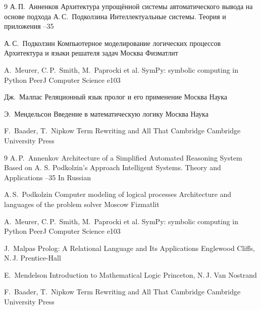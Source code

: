 \documentclass{intsys}
\begin{document}
\begin{thebibliographyRU}{9}
  \by А.\,П.~Анненков
  \paper Архитектура упрощённой системы автоматического вывода на
  основе подхода А.\,С.~Подколзина
  \jour Интеллектуальные системы. Теория и приложения
  --35

  \by А.\,С.~Подколзин
  \book Компьютерное моделирование логических процессов
  \voltitle Архитектура и языки решателя задач
  \publaddr Москва
  \publ Физматлит

  \by A.~Meurer, C.\,P.~Smith, M.~Paprocki et al.
  \paper SymPy: symbolic computing in Python
  \jour PeerJ Computer Science
  \pages e103

  \by Дж.~Малпас
  \book Реляционный язык пролог и его применение
  \publaddr Москва
  \publ Наука

  \by Э.~Мендельсон
  \book Введение в математическую логику
  \publaddr Москва
  \publ Наука

  \by F.~Baader, T.~Nipkow
  \book Term Rewriting and All That
  \publaddr Cambridge
  \publ Cambridge University Press

\end{thebibliographyRU}

\begin{thebibliographyEN}{9}
  \by A.\,P.~Annenkov
  \paper Architecture of a Simplified Automated Reasoning System
  Based on A. S. Podkolzin's Approach
  \jour Intelligent Systems. Theory and Applications
  --35
  \lang In Russian

  \by A.\,S.~Podkolzin
  \book Computer modeling of logical processes
  \voltitle Architecture and languages of the problem solver
  \publaddr Moscow
  \publ Fizmatlit

  \by A.~Meurer, C.\,P.~Smith, M.~Paprocki et al.
  \paper SymPy: symbolic computing in Python
  \jour PeerJ Computer Science
  \pages e103

  \by J.~Malpas
  \book Prolog: A Relational Language and Its Applications
  \publaddr Englewood Cliffs, N.\,J.
  \publ Prentice-Hall

  \by E.~Mendelson
  \book Introduction to Mathematical Logic
  \publaddr Princeton, N.\,J.
  \publ Van Nostrand

  \by F.~Baader, T.~Nipkow
  \book Term Rewriting and All That
  \publaddr Cambridge
  \publ Cambridge University Press
\end{thebibliographyEN}
\end{document}
